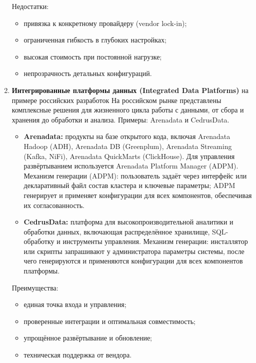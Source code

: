 \begin{enumerate}
	      Недостатки:
	      \begin{itemize}
		      \item привязка к конкретному провайдеру (vendor lock-in);
		      \item ограниченная гибкость в глубоких настройках;
		      \item высокая стоимость при постоянной нагрузке;
		      \item непрозрачность детальных конфигураций.
	      \end{itemize}
	\item \textbf{Интегрированные платформы данных (Integrated Data Platforms)} на примере российских разработок
	      На российском рынке представлены комплексные решения для жизненного цикла работы с данными, от сбора и хранения до обработки и анализа. Примеры: Arenadata и CedrusData.
	      \begin{itemize}

		      \item \textbf{Arenadata:} продукты на базе открытого кода, включая Arenadata Hadoop (ADH), Arenadata DB (Greenplum), Arenadata Streaming (Kafka, NiFi), Arenadata QuickMarts (ClickHouse). Для управления развёртыванием используется Arenadata Platform Manager (ADPM).
		            Механизм генерации (ADPM): пользователь задаёт через интерфейс или декларативный файл состав кластера и ключевые параметры; ADPM генерирует и применяет конфигурации для всех компонентов, обеспечивая их согласованность.

		      \item \textbf{CedrusData:} платформа для высокопроизводительной аналитики и обработки данных, включающая распределённое хранилище, SQL-обработку и инструменты управления.
		            Механизм генерации: инсталлятор или скрипты запрашивают у администратора параметры системы, после чего генерируются и применяются конфигурации для всех компонентов платформы.
	      \end{itemize}
	      Преимущества:
	      \begin{itemize}
		      \item единая точка входа и управления;
		      \item проверенные интеграции и оптимальная совместимость;
		      \item упрощённое развёртывание и обновление;
		      \item техническая поддержка от вендора.
	      \end{itemize}


\end{enumerate}
